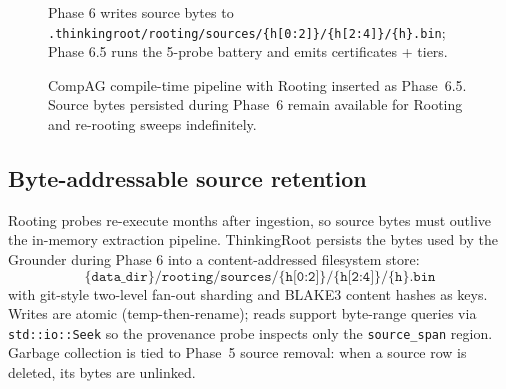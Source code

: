 \documentclass[10pt,a4paper]{article}
\begin{document}
\begin{figure}[t]
\centering
{}
\vspace{2pt}
\begin{center}\footnotesize
Phase 6 writes source bytes to
\texttt{.thinkingroot/rooting/sources/\{h[0:2]\}/\{h[2:4]\}/\{h\}.bin};
Phase 6.5 runs the 5-probe battery and emits certificates + tiers.
\end{center}
\caption{CompAG compile-time pipeline with Rooting inserted as Phase~6.5.
Source bytes persisted during Phase~6 remain available for Rooting and
re-rooting sweeps indefinitely.}
\label{fig:pipeline}
\end{figure}

\subsection{Byte-addressable source retention}

Rooting probes re-execute months after ingestion, so source bytes must
outlive the in-memory extraction pipeline. ThinkingRoot persists the bytes
used by the Grounder during Phase 6 into a content-addressed filesystem
store:
\[
  \texttt{\{data\_dir\}/rooting/sources/\{h[0:2]\}/\{h[2:4]\}/\{h\}.bin}
\]
with git-style two-level fan-out sharding and BLAKE3 content hashes as keys.
Writes are atomic (temp-then-rename); reads support byte-range queries via
\texttt{std::io::Seek} so the provenance probe inspects only the
\texttt{source\_span} region. Garbage collection is tied to Phase~5 source
removal: when a source row is deleted, its bytes are unlinked.
\end{document}

